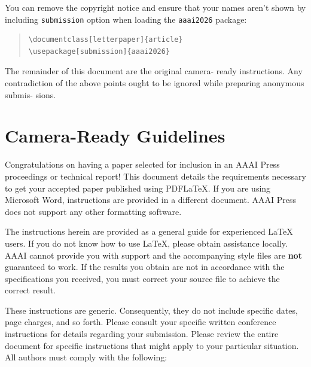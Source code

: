 \documentclass[letterpaper]{article} %
\begin{document}
You can remove the copyright notice and ensure that your names aren't shown by including \texttt{submission} option when loading the \texttt{aaai2026} package:

\begin{quote}\begin{scriptsize}\begin{verbatim}
\documentclass[letterpaper]{article}
\usepackage[submission]{aaai2026}
\end{verbatim}\end{scriptsize}\end{quote}

The remainder of this document are the original camera-
ready instructions. Any contradiction of the above points
ought to be ignored while preparing anonymous submis-
sions.

\section{Camera-Ready Guidelines}

Congratulations on having a paper selected for inclusion in an AAAI Press proceedings or technical report! This document details the requirements necessary to get your accepted paper published using PDF\LaTeX{}. If you are using Microsoft Word, instructions are provided in a different document. AAAI Press does not support any other formatting software.

The instructions herein are provided as a general guide for experienced \LaTeX{} users. If you do not know how to use \LaTeX{}, please obtain assistance locally. AAAI cannot provide you with support and the accompanying style files are \textbf{not} guaranteed to work. If the results you obtain are not in accordance with the specifications you received, you must correct your source file to achieve the correct result.

These instructions are generic. Consequently, they do not include specific dates, page charges, and so forth. Please consult your specific written conference instructions for details regarding your submission. Please review the entire document for specific instructions that might apply to your particular situation. All authors must comply with the following:
\end{document}
